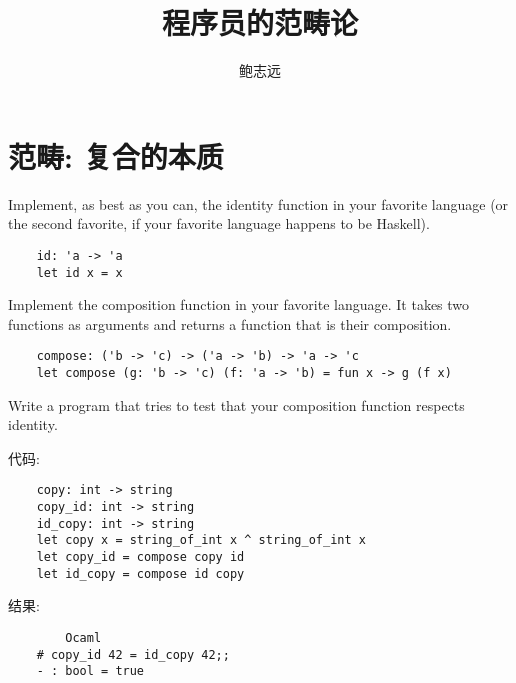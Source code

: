 \documentclass[lang=cn]{elegantbook}
\title{程序员的范畴论}
\author{鲍志远}
\begin{document}
\maketitle
\mainmatter

\chapter{范畴: 复合的本质}

\begin{exercise}
Implement, as best as you can, the identity function in your favorite language (or the second favorite, if your favorite language happens to be Haskell).
\end{exercise}

\begin{solution}

\begin{verbatim}
    id: 'a -> 'a
    let id x = x
\end{verbatim}

\end{solution}

\begin{exercise}
Implement the composition function in your favorite language. It takes two functions as arguments and returns a function that is their composition.
\end{exercise}

\begin{solution}

\begin{verbatim}
    compose: ('b -> 'c) -> ('a -> 'b) -> 'a -> 'c
    let compose (g: 'b -> 'c) (f: 'a -> 'b) = fun x -> g (f x)
\end{verbatim}

\end{solution}

\begin{exercise}
Write a program that tries to test that your composition function respects identity.
\end{exercise}

\begin{solution}

代码:

\begin{verbatim}
    copy: int -> string
    copy_id: int -> string
    id_copy: int -> string
    let copy x = string_of_int x ^ string_of_int x
    let copy_id = compose copy id
    let id_copy = compose id copy
\end{verbatim}

结果:

\begin{verbatim}
        Ocaml
    # copy_id 42 = id_copy 42;;
    - : bool = true
\end{verbatim}
\end{solution}
\end{document}
